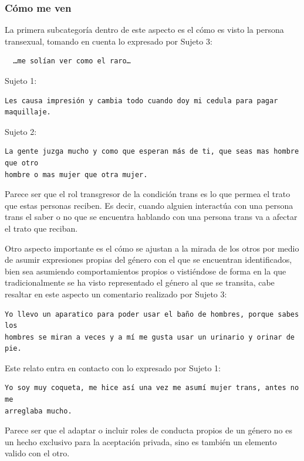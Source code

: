 \subsubsection{Cómo me ven}

La primera subcategoría dentro de este aspecto es el cómo es visto la persona
transexual, tomando en cuenta lo expresado por Sujeto 3:

\begin{verbatim}
  …me solían ver como el raro…
\end{verbatim}

Sujeto 1:

\begin{verbatim}
Les causa impresión y cambia todo cuando doy mi cedula para pagar maquillaje.
\end{verbatim}

Sujeto 2:

\begin{verbatim}
La gente juzga mucho y como que esperan más de ti, que seas mas hombre que otro
hombre o mas mujer que otra mujer.
\end{verbatim}

Parece ser que el rol transgresor de la condición trans es lo que permea el
trato que estas personas reciben. Es decir, cuando alguien interactúa con una
persona trans el saber o no que se encuentra hablando con una persona trans va a
afectar el trato que reciban.

Otro aspecto importante es el cómo se ajustan a la mirada de los otros por medio
de asumir  expresiones propias del género con el que se encuentran
identificados, bien sea asumiendo comportamientos propios o vistiéndose de forma
en la que tradicionalmente se ha visto representado el género al que se
transita, cabe resaltar en este aspecto un comentario realizado por Sujeto 3:

\begin{verbatim}
Yo llevo un aparatico para poder usar el baño de hombres, porque sabes los
hombres se miran a veces y a mí me gusta usar un urinario y orinar de pie.
\end{verbatim}

Este relato entra en contacto con lo expresado por Sujeto 1:

\begin{verbatim}
Yo soy muy coqueta, me hice así una vez me asumí mujer trans, antes no me
arreglaba mucho.
\end{verbatim}

Parece ser que el adaptar o incluir roles de conducta propios de un género no es
un hecho exclusivo para la aceptación privada, sino es también un elemento
valido con el otro.

